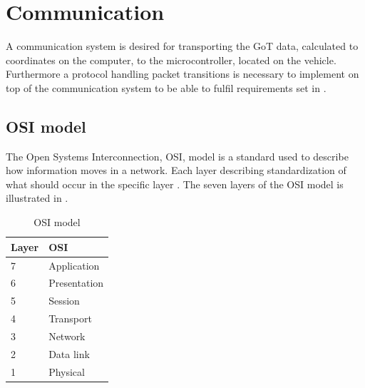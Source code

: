 \chapter{Communication}
A communication system is desired for transporting the GoT data, calculated to coordinates on the computer, to the microcontroller, located on the vehicle. Furthermore a protocol handling packet transitions is necessary to implement on top of the communication system to be able to fulfil requirements set in .

\section{OSI model}
The Open Systems Interconnection, OSI, model is a standard used to describe how information moves in a network. Each layer describing standardization of what should occur in the specific layer \cite{Microsoft}. The seven layers of the OSI model is illustrated in .

\begin{table}[H]\centering
\begin{tabular}{|p{1.5cm}|p{3cm}|}
\hline%
  \textbf{Layer} & \textbf{OSI} \\
\hline%
    7 &    Application      \\
\hline%
    6 &    Presentation      \\
\hline%
    5 &    Session       \\
\hline%
    4 &    Transport    \\
\hline%
    3 &   Network     \\
\hline%
    2 &   Data link     \\
\hline%
    1 &    Physical     \\
\hline%
\end{tabular}
\caption{OSI model}
\label{tab:OSIModel}
\end{table}

